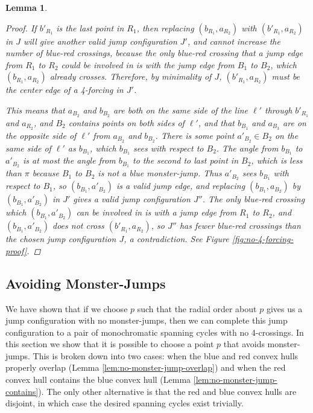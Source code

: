 \documentclass[12pt]{article}
\newtheorem{lemma}{Lemma}
\theoremstyle{definition}
\begin{document}
\begin{lemma}
\begin{proof}
    If $b'_{R_1}$ is the last point in $R_1$, then replacing $(b_{R_1},a_{R_2})$ with $(b'_{R_1},a_{R_2})$ in $J$ will give another valid jump configuration $J'$, and cannot increase the number of blue-red crossings, because the only blue-red crossing that a jump edge from $R_1$ to $R_2$ could be involved in is with the jump edge from $B_1$ to $B_2$, which $(b_{R_1},a_{R_2})$ already crosses.
    Therefore, by minimality of $J$, $(b'_{R_1},a_{R_2})$ must be the center edge of a 4-forcing in $J'$.

    This means that $a_{B_2}$ and $b_{B_2}$ are both on the same side of the line $\ell'$ through $b'_{R_1}$ and $a_{R_2}$, and $B_2$ contains points on both sides of $\ell'$, and that $b_{B_1}$ and $a_{B_3}$ are on the opposite side of $\ell'$ from $a_{B_2}$ and $b_{B_2}$.
    There is some point $a'_{B_2}\in B_2$ on the same side of $\ell'$ as $b_{B_1}$, which $b_{B_1}$ sees with respect to $B_2$.
    The angle from $b_{B_1}$ to $a'_{B_2}$ is at most the angle from $b_{B_1}$ to the second to last point in $B_2$, which is less than $\pi$ because $B_1$ to $B_2$ is not a blue monster-jump.
    Thus $a'_{B_2}$ sees $b_{B_1}$ with respect to $B_1$, so $(b_{B_1},a'_{B_2})$ is a valid jump edge, and replacing $(b_{B_1},a_{B_2})$ by $(b_{B_1},a'_{B_2})$ in $J'$ gives a valid jump configuration $J''$.
    The only blue-red crossing which $(b_{B_1},a'_{B_2})$ can be involved in is with a jump edge from $R_1$ to $R_2$, and $(b_{B_1},a'_{B_2})$ does not cross $(b'_{R_1},a_{R_2})$, so $J''$ has fewer blue-red crossings than the chosen jump configuration $J$, a contradiction.
    See Figure \ref{fig:no-4-forcing-proof}.
  \end{proof}
\end{lemma}


\subsection{Avoiding Monster-Jumps}
We have shown that if we choose $p$ such that the radial order about $p$ gives us a jump configuration with no monster-jumps, then we can complete this jump configuration to a pair of monochromatic spanning cycles with no 4-crossings. In this section we show that it is possible to choose a point $p$ that avoids monster-jumps.
This is broken down into two cases: when the blue and red convex hulls properly overlap (Lemma \ref{lem:no-monster-jump-overlap}) and when the red convex hull contains the blue convex hull (Lemma \ref{lem:no-monster-jump-contains}).
The only other alternative is that the red and blue convex hulls are disjoint, in which case the desired spanning cycles exist trivially.
\end{document}
